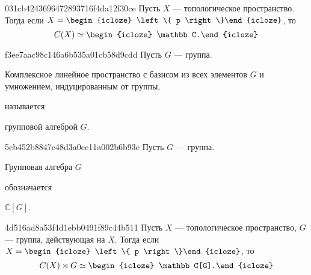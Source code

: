 \begin{note}{031cb4243696472893716f4da12f30ce}
    Пусть \({ X }\) --- топологическое пространство.
    Тогда если \({ X = \begin{icloze}{2}\left\{ p \right\}\end{icloze} }\), то
    \[
        C(X) \simeq \begin{icloze}{1}\mathbb C.\end{icloze}
    \]
\end{note}

\begin{note}{f3ee7aac98c146a6b535a01cb58d9cdd}
    Пусть \({ G }\) --- группа.
    \begin{icloze}{1}Комплексное линейное пространство с базисом из всех элементов \({ G }\) и умножением, индуцированным от группы,\end{icloze} называется \begin{icloze}{2}групповой алгеброй \({ G }\).\end{icloze}
\end{note}

\begin{note}{5cb452b8847e48d3a0ee11a002b6b93e}
    Пусть \({ G }\) --- группа.
    \begin{icloze}{2}Групповая алгебра \({ G }\)\end{icloze} обозначается \begin{icloze}{1}\({ \mathbb C[G] }\).\end{icloze}
\end{note}

\begin{note}{4d516ad8a53f4d1ebb0491f89c44b511}
    Пусть \({ X }\) --- топологическое пространство, \({ G }\) --- группа, действующая на \({ X }\).
    Тогда если \({ X = \begin{icloze}{2}\left\{ p \right\}\end{icloze} }\), то
    \[
        C(X) \rtimes G \simeq \begin{icloze}{1}\mathbb C[G].\end{icloze}
    \]
\end{note}


